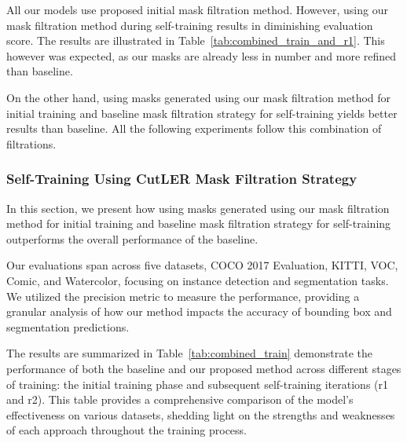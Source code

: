 All our models use proposed initial mask filtration method. However, using our mask filtration method during self-training results in diminishing evaluation score. The results are illustrated in Table~\ref{tab:combined_train_and_r1}. This however was expected, as our masks are already less in number and more refined than baseline.

On the other hand, using masks generated using our mask filtration method for initial training and baseline mask filtration strategy for self-training yields better results than baseline. All the following experiments follow this combination of filtrations.

\subsubsection{Self-Training Using CutLER Mask Filtration Strategy}

In this section, we present how using masks generated using our mask filtration method for initial training and baseline mask filtration strategy for self-training outperforms the overall performance of the baseline. 

Our evaluations span across five datasets, COCO 2017 Evaluation, KITTI, VOC, Comic, and Watercolor, focusing on instance detection and segmentation tasks. We utilized the precision metric to measure the performance, providing a granular analysis of how our method impacts the accuracy of bounding box and segmentation predictions.

The results are summarized in Table~\ref{tab:combined_train} demonstrate the performance of both the baseline and our proposed method across different stages of training: the initial training phase and subsequent self-training iterations (r1 and r2). This table provides a comprehensive comparison of the model’s effectiveness on various datasets, shedding light on the strengths and weaknesses of each approach throughout the training process.


